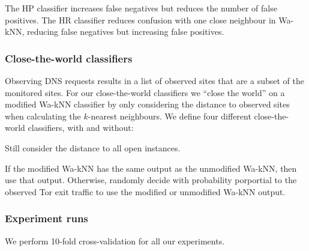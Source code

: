 The HP classifier increases false negatives but reduces the number of false
positives. The HR classifier reduces confusion with one close neighbour in
Wa-kNN, reducing false negatives but increasing false positives.

\subsubsection{Close-the-world classifiers}
Observing DNS requests results in a list of observed sites that are a subset of
the monitored sites.
For our close-the-world classifiers we ``close the world''
on a modified Wa-kNN classifier by only considering the distance to observed
sites when calculating the $k$-nearest neighbours.
We define four different close-the-world classifiers, with and without:

\begin{description}
	\item[Open] Still consider the distance to all open instances.
	\item[Consensus] If the modified Wa-kNN has the same output as the
	unmodified Wa-kNN, then use that output. Otherwise, randomly decide with
	probability	porportial to the observed Tor exit traffic to use the modified or
	unmodified Wa-kNN output.
\end{description}

\subsubsection{Experiment runs}
We perform 10-fold cross-validation for all our experiments.
